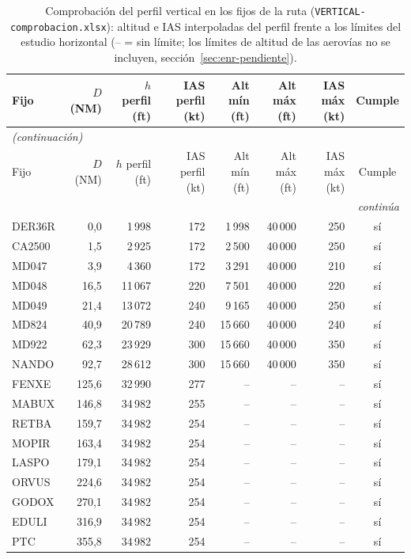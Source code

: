 \begingroup\scriptsize\setlength{\tabcolsep}{2.8pt}
\begin{longtable}{lrrrrrrc}
\caption{Comprobación del perfil vertical en los fijos de la ruta (\texttt{VERTICAL-comprobacion.xlsx}): altitud e IAS interpoladas del perfil frente a los límites del estudio horizontal (-- = sin límite; los límites de altitud de las aerovías no se incluyen, sección~\ref{sec:enr-pendiente}).}\label{tab:chk}\\
\toprule
Fijo & $D$ (NM) & $h$ perfil (ft) & IAS perfil (kt) & Alt mín (ft) & Alt máx (ft) & IAS máx (kt) & Cumple\\
\midrule
\endfirsthead
\multicolumn{8}{l}{\small\itshape (continuación)}\\
\toprule
Fijo & $D$ (NM) & $h$ perfil (ft) & IAS perfil (kt) & Alt mín (ft) & Alt máx (ft) & IAS máx (kt) & Cumple\\
\midrule
\endhead
\midrule
\multicolumn{8}{r}{\small\itshape continúa}\\
\endfoot
\bottomrule
\endlastfoot
DER36R & 0,0 & 1\,998 & 172 & 1\,998 & 40\,000 & 250 & sí\\
CA2500 & 1,5 & 2\,925 & 172 & 2\,500 & 40\,000 & 250 & sí\\
MD047 & 3,9 & 4\,360 & 172 & 3\,291 & 40\,000 & 210 & sí\\
MD048 & 16,5 & 11\,067 & 220 & 7\,501 & 40\,000 & 220 & sí\\
MD049 & 21,4 & 13\,072 & 240 & 9\,165 & 40\,000 & 250 & sí\\
MD824 & 40,9 & 20\,789 & 240 & 15\,660 & 40\,000 & 240 & sí\\
MD922 & 62,3 & 23\,929 & 300 & 15\,660 & 40\,000 & 350 & sí\\
NANDO & 92,7 & 28\,612 & 300 & 15\,660 & 40\,000 & 350 & sí\\
FENXE & 125,6 & 32\,990 & 277 & -- & -- & -- & sí\\
MABUX & 146,8 & 34\,982 & 255 & -- & -- & -- & sí\\
RETBA & 159,7 & 34\,982 & 254 & -- & -- & -- & sí\\
MOPIR & 163,4 & 34\,982 & 254 & -- & -- & -- & sí\\
LASPO & 179,1 & 34\,982 & 254 & -- & -- & -- & sí\\
ORVUS & 224,6 & 34\,982 & 254 & -- & -- & -- & sí\\
GODOX & 270,1 & 34\,982 & 254 & -- & -- & -- & sí\\
EDULI & 316,9 & 34\,982 & 254 & -- & -- & -- & sí\\
PTC & 355,8 & 34\,982 & 254 & -- & -- & -- & sí\\

\end{longtable}
